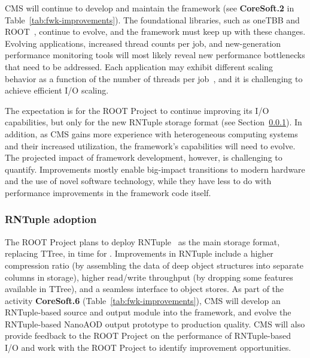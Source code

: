 CMS will continue to develop and maintain the framework (see \textbf{CoreSoft.2} in Table~\ref{tab:fwk-improvements}). The foundational libraries, such as oneTBB and \textsc{ROOT}~\cite{BRUN199781}, continue to evolve, and the framework must keep up with these changes. Evolving applications, increased thread counts per job, and new-generation performance monitoring tools will most likely reveal new performance bottlenecks that need to be addressed. Each application may exhibit different scaling behavior as a function of the number of threads per job~\cite{Jones:2023ujn}, and it is challenging to achieve efficient I/O scaling.

The expectation is for the \textsc{ROOT} Project to continue improving its I/O capabilities, but only for the new RNTuple storage format (see Section~\ref{sec:rntuple}). In addition, as CMS gains more experience with heterogeneous computing systems and their increased utilization, the framework’s capabilities will need to evolve. The projected impact of framework development, however, is challenging to quantify. Improvements mostly enable big-impact transitions to modern hardware and the use of novel software technology, while they have less to do with performance improvements in the framework code itself.


\subsubsection{RNTuple adoption}
\label{sec:rntuple}

The \textsc{ROOT} Project plans to deploy RNTuple~\cite{rntuple:chep19,rntuple:chep23} as the main storage format, replacing TTree, in time for \RunFour. Improvements in RNTuple include a higher compression ratio (by assembling the data of deep object structures into separate columns in storage), higher read/write throughput (by dropping some features available in TTree), and a seamless interface to object stores. As part of the activity \textbf{CoreSoft.6} (Table~\ref{tab:fwk-improvements}), CMS will develop an RNTuple-based source and output module into the framework, and evolve the RNTuple-based NanoAOD output prototype to production quality. CMS will also provide feedback to the \textsc{ROOT} Project on the performance of RNTuple-based I/O and work with the \textsc{ROOT} Project to identify improvement opportunities.

